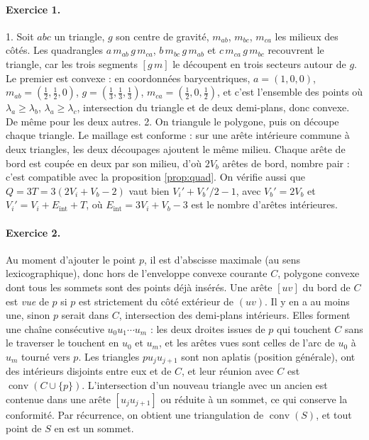 \documentclass[11pt,a4paper]{article}
\theoremstyle{plain}
\theoremstyle{definition}
\theoremstyle{remark}
\DeclareMathOperator{\conv}{conv}
\begin{document}
\paragraph{Exercice 1.} 1. Soit $abc$ un triangle, $g$ son centre de gravité, $m_{ab}$, $m_{bc}$, $m_{ca}$ les milieux des côtés. Les quadrangles $a\,m_{ab}\,g\,m_{ca}$, $b\,m_{bc}\,g\,m_{ab}$ et $c\,m_{ca}\,g\,m_{bc}$ recouvrent le triangle, car les trois segments $[g\,m]$ le découpent en trois secteurs autour de $g$. Le premier est convexe : en coordonnées barycentriques, $a=(1,0,0)$, $m_{ab}=(\frac12,\frac12,0)$, $g=(\frac13,\frac13,\frac13)$, $m_{ca}=(\frac12,0,\frac12)$, et c'est l'ensemble des points où $\lambda_a\geq\lambda_b$, $\lambda_a\geq\lambda_c$, intersection du triangle et de deux demi-plans, donc convexe. De même pour les deux autres. 2. On triangule le polygone, puis on découpe chaque triangle. Le maillage est conforme : sur une arête intérieure commune à deux triangles, les deux découpages ajoutent le même milieu. Chaque arête de bord est coupée en deux par son milieu, d'où $2V_b$ arêtes de bord, nombre pair : c'est compatible avec la proposition \ref{prop:quad}. On vérifie aussi que $Q=3T=3(2V_i+V_b-2)$ vaut bien $V_i'+V_b'/2-1$, avec $V_b'=2V_b$ et $V_i'=V_i+E_{\text{int}}+T$, où $E_{\text{int}}=3V_i+V_b-3$ est le nombre d'arêtes intérieures.

\paragraph{Exercice 2.} Au moment d'ajouter le point $p$, il est d'abscisse maximale (au sens lexicographique), donc hors de l'enveloppe convexe courante $C$, polygone convexe dont tous les sommets sont des points déjà insérés. Une arête $[uv]$ du bord de $C$ est \emph{vue} de $p$ si $p$ est strictement du côté extérieur de $(uv)$. Il y en a au moins une, sinon $p$ serait dans $C$, intersection des demi-plans intérieurs. Elles forment une chaîne consécutive $u_0u_1\cdots u_m$ : les deux droites issues de $p$ qui touchent $C$ sans le traverser le touchent en $u_0$ et $u_m$, et les arêtes vues sont celles de l'arc de $u_0$ à $u_m$ tourné vers $p$. Les triangles $pu_ju_{j+1}$ sont non aplatis (position générale), ont des intérieurs disjoints entre eux et de $C$, et leur réunion avec $C$ est $\conv(C\cup\{p\})$. L'intersection d'un nouveau triangle avec un ancien est contenue dans une arête $[u_ju_{j+1}]$ ou réduite à un sommet, ce qui conserve la conformité. Par récurrence, on obtient une triangulation de $\conv(S)$, et tout point de $S$ en est un sommet.
\end{document}
